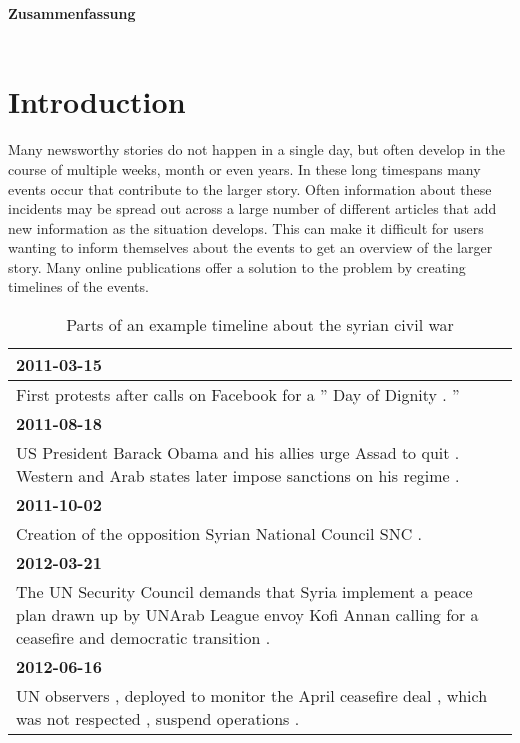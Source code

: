 \documentclass[a4paper,BCOR=10mm]{report}
\numberwithin{lemma}{chapter}
\numberwithin{definition}{chapter}
\begin{document}
\begin{titlepage}
\newpage
\noindent
\Large\textbf{Zusammenfassung}\\
\\

\newpage
\normalsize
\tableofcontents

\end{titlepage}



\chapter{Introduction}

Many newsworthy stories do not happen in a single day, but often develop in the course of multiple weeks, month or even years. In these long timespans many events occur that contribute to the larger story. Often information about these incidents may be spread out across a large number of different articles that add new information as the situation develops. This can make it difficult for users wanting to inform themselves about the events to get an overview of the larger story. Many online publications offer a solution to the problem by creating timelines of the events.

\begin{table}
\begin{tabularx}{\textwidth}{|X|}
\textbf{2011-03-15} \\\hline
First protests after calls on Facebook for a '' Day of Dignity . '' \\\hline
\textbf{2011-08-18} \\\hline
US President Barack Obama and his allies urge Assad to quit . \newline Western and Arab states later impose sanctions on his regime . \\\hline
\textbf{2011-10-02} \\\hline
Creation of the opposition Syrian National Council SNC . \\\hline
\textbf{2012-03-21} \\\hline
The UN Security Council demands that Syria implement a peace plan drawn up by UNArab League envoy Kofi Annan calling for a ceasefire and democratic transition . \\\hline
\textbf{2012-06-16} \\\hline
UN observers , deployed to monitor the April ceasefire deal , which was not respected , suspend operations . \\\hline
\end{tabularx}
\caption{Parts of an example timeline about the syrian civil war}
\label{tab:example-tl}
\end{table}
\end{document}
